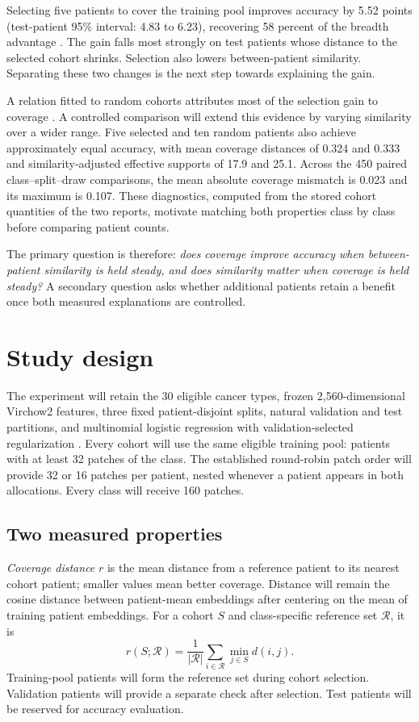\documentclass[11pt]{article}
\begin{document}
Selecting five patients to cover the training pool improves accuracy by 5.52 points (test-patient 95\% interval: 4.83 to 6.23), recovering 58 percent of the breadth advantage \citep{queisler2026shortageSelection}. The gain falls most strongly on test patients whose distance to the selected cohort shrinks. Selection also lowers between-patient similarity. Separating these two changes is the next step towards explaining the gain.

A relation fitted to random cohorts attributes most of the selection gain to coverage \citep{queisler2026coverageRedundancy}. A controlled comparison will extend this evidence by varying similarity over a wider range. Five selected and ten random patients also achieve approximately equal accuracy, with mean coverage distances of 0.324 and 0.333 and similarity-adjusted effective supports of 17.9 and 25.1. Across the 450 paired class--split--draw comparisons, the mean absolute coverage mismatch is 0.023 and its maximum is 0.107. These diagnostics, computed from the stored cohort quantities of the two reports, motivate matching both properties class by class before comparing patient counts.

The primary question is therefore: \emph{does coverage improve accuracy when between-patient similarity is held steady, and does similarity matter when coverage is held steady?} A secondary question asks whether additional patients retain a benefit once both measured explanations are controlled.

\section{Study design}
\label{sec:design}
The experiment will retain the 30 eligible cancer types, frozen 2,560-dimensional Virchow2 features, three fixed patient-disjoint splits, natural validation and test partitions, and multinomial logistic regression with validation-selected regularization \citep{queisler2026shortageSelection}. Every cohort will use the same eligible training pool: patients with at least 32 patches of the class. The established round-robin patch order will provide 32 or 16 patches per patient, nested whenever a patient appears in both allocations. Every class will receive 160 patches.

\subsection{Two measured properties}
\label{sec:quantities}
\emph{Coverage distance} $r$ is the mean distance from a reference patient to its nearest cohort patient; smaller values mean better coverage. Distance will remain the cosine distance between patient-mean embeddings after centering on the mean of training patient embeddings. For a cohort $S$ and class-specific reference set $\mathcal R$, it is
\begin{equation}
 r(S;\mathcal R)=\frac{1}{|\mathcal R|}\sum_{i\in\mathcal R}\min_{j\in S}d(i,j).
 \label{eq:coverage}
\end{equation}
\noindent Training-pool patients will form the reference set during cohort selection. Validation patients will provide a separate check after selection. Test patients will be reserved for accuracy evaluation.
\end{document}
